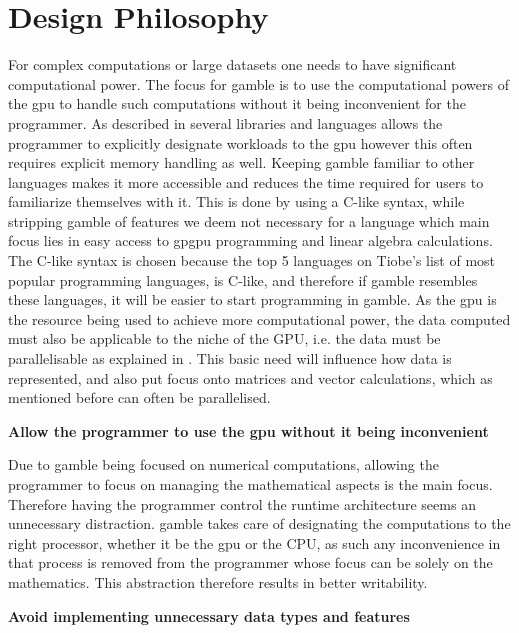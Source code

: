 \section{Design Philosophy}\label{sec:phil}

For complex computations or large datasets one needs to have significant computational power.
The focus for \gls{gamble} is to use the computational powers of the \acrshort{gpu} to handle such computations without it being inconvenient for the programmer.
As described in  several libraries and languages allows the programmer to explicitly designate workloads to the \acrshort{gpu} however this often requires explicit memory handling as well.
Keeping \gls{gamble} familiar to other languages makes it more accessible and reduces the time required for users to familiarize themselves with it.
This is done by using a C-like syntax, while stripping \gls{gamble} of features we deem not necessary for a language which main focus lies in easy access to \acrshort{gpgpu} programming and linear algebra calculations.
The C-like syntax is chosen because the top 5 languages on Tiobe's list of most popular programming languages, is C-like, and therefore if \gls{gamble} resembles these languages, it will be easier to start programming in \gls{gamble}.\citep{TIOBE}
As the \acrshort{gpu} is the resource being used to achieve more computational power, the data computed must also be applicable to the niche of the GPU, i.e. the data must be parallelisable as explained in .
This basic need will influence how data is represented, and also put focus onto matrices and vector calculations, which as mentioned before can often be parallelised.

\textbf{Allow the programmer to use the \acrshort{gpu} without it being inconvenient}

Due to \gls{gamble} being focused on numerical computations, allowing the programmer to focus on managing the mathematical aspects is the main focus.
Therefore having the programmer control the runtime architecture seems an unnecessary distraction.
\gls{gamble} takes care of designating the computations to the right processor, whether it be the \acrshort{gpu} or the CPU, as such any inconvenience in that process is removed from the programmer whose focus can be solely on the mathematics.
This abstraction therefore results in better writability.

\textbf{Avoid implementing unnecessary data types and features}

